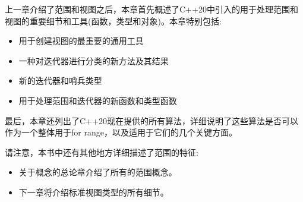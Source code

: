 上一章介绍了范围和视图之后，本章首先概述了C++20中引入的用于处理范围和视图的重要细节和工具(函数，类型和对象)。本章特别包括:

\begin{itemize}
\item
用于创建视图的最重要的通用工具

\item
一种对迭代器进行分类的新方法及其结果

\item
新的迭代器和哨兵类型

\item
用于处理范围和迭代器的新函数和类型函数
\end{itemize}

最后，本章还列出了C++20现在提供的所有算法，详细说明了这些算法是否可以作为一个整体用于for range，以及适用于它们的几个关键方面。

请注意，本书中还有其他地方详细描述了范围的特征:

\begin{itemize}
\item
关于概念的总论章介绍了所有的范围概念。

\item
下一章将介绍标准视图类型的所有细节。
\end{itemize}













